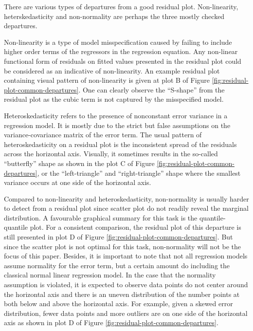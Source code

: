 \documentclass[]{interact}
\theoremstyle{plain}%
\theoremstyle{definition}
\theoremstyle{remark}
\begin{document}
There are various types of departures from a good residual plot.
Non-linearity, heterskedasticity and non-normality are perhaps the three
mostly checked departures.

Non-linearity is a type of model misspecification caused by failing to
include higher order terms of the regressors in the regression equation.
Any non-linear functional form of residuals on fitted values presented
in the residual plot could be considered as an indicative of
non-linearity. An example residual plot containing visual pattern of
non-linearity is given at plot B of Figure
\ref{fig:residual-plot-common-departures}. One can clearly observe the
``S-shape'' from the residual plot as the cubic term is not captured by
the misspecified model.

Heteroskedasticity refers to the presence of nonconstant error variance
in a regression model. It is mostly due to the strict but false
assumptions on the variance-covariance matrix of the error term. The
usual pattern of heteroskedasticity on a residual plot is the
inconsistent spread of the residuals across the horizontal axis.
Visually, it sometimes results in the so-called ``butterfly'' shape as
shown in the plot C of Figure \ref{fig:residual-plot-common-departures},
or the ``left-triangle'' and ``right-triangle'' shape where the smallest
variance occurs at one side of the horizontal axis.

Compared to non-linearity and heteroskedasticity, non-normality is
usually harder to detect from a residual plot since scatter plot do not
readily reveal the marginal distribution. A favourable graphical summary
for this task is the quantile-quantile plot. For a consistent
comparison, the residual plot of this departure is still presented in
plot D of Figure \ref{fig:residual-plot-common-departures}. But since
the scatter plot is not optimal for this task, non-normality will not be
the focus of this paper. Besides, it is important to note that not all
regression models assume normality for the error term, but a certain
amount do including the classical normal linear regression model. In the
case that the normality assumption is violated, it is expected to
observe data points do not center around the horizontal axis and there
is an uneven distribution of the number points at both below and above
the horizontal axis. For example, given a skewed error distribution,
fewer data points and more outliers are on one side of the horizontal
axis as shown in plot D of Figure
\ref{fig:residual-plot-common-departures}.
\end{document}
